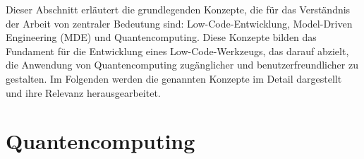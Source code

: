 Dieser Abschnitt erläutert die grundlegenden Konzepte, die für das Verständnis der Arbeit von zentraler Bedeutung sind: 
Low-Code-Entwicklung, Model-Driven Engineering (MDE) und Quantencomputing. Diese Konzepte bilden das Fundament für die 
Entwicklung eines Low-Code-Werkzeugs, das darauf abzielt, die Anwendung von Quantencomputing zugänglicher und 
benutzerfreundlicher zu gestalten. Im Folgenden werden die genannten Konzepte im Detail dargestellt und ihre Relevanz herausgearbeitet.


\section{Quantencomputing}
